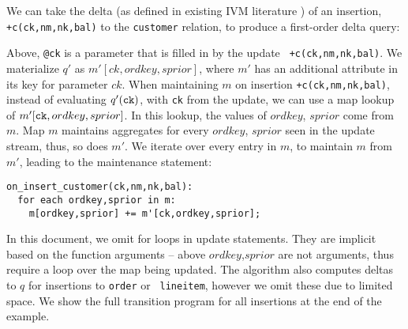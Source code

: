 {We can take the delta (as defined in existing IVM literature
\todo{[REFs]}) of an insertion, {\tt +c(ck,nm,nk,bal)} to the {\tt customer}
relation, to produce a first-order delta query:


\noindent Above, {\tt @ck} is a parameter that is filled in by the update {\tt
+c(ck,nm,nk,bal)}. We materialize $q'$ as $m'[ck,ordkey,sprior]$, where $m'$ has
an additional attribute in its key for parameter $ck$. When maintaining $m$ on
insertion {\tt +c(ck,nm,nk,bal)}, instead of evaluating $q'(\mbox{{\tt ck}})$,
with {\tt ck} from the update, we can use a map lookup of $m'[\mbox{{\tt
ck}},ordkey,sprior]$. In this lookup, the values of $ordkey$, $sprior$ come from
$m$. Map $m$ maintains aggregates for every $ordkey$, $sprior$ seen in the
update stream, thus, so does $m'$. We iterate over every entry in $m$, to
maintain $m$ from $m'$, leading to the maintenance statement:

\begin{verbatim}
on_insert_customer(ck,nm,nk,bal):
  for each ordkey,sprior in m:
    m[ordkey,sprior] += m'[ck,ordkey,sprior];
\end{verbatim}

\noindent In this document, we omit for loops in update statements. They are
implicit based on the function arguments -- above $ordkey$,$sprior$ are not
arguments, thus require a loop over the map being updated.
The algorithm also computes deltas to $q$ for insertions to {\tt order} or {\tt
lineitem}, however we omit these due to limited space. We show the full
transition program for all insertions at the end of the example.

}
